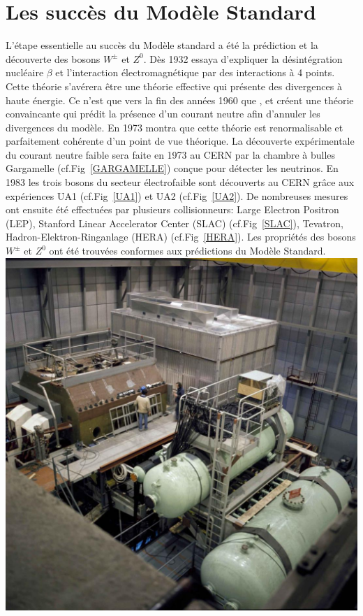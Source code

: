 \section{Les succès du Modèle Standard}
L'étape essentielle au succès du Modèle standard a été la prédiction et la découverte des bosons $W^{\pm}$ et $Z^{0}$. Dès \num{1932}  essaya d'expliquer la désintégration nucléaire $\beta$ et l'interaction électromagnétique par des interactions à \num{4} points. Cette théorie s'avérera être une théorie effective qui présente des divergences à haute énergie. Ce n'est que vers la fin des années \num{1960} que ,  et  créent une théorie convaincante qui prédit la présence d'un courant neutre afin d'annuler les divergences du modèle. En \num{1973}  montra que cette théorie est renormalisable et parfaitement cohérente d'un point de vue théorique. La découverte expérimentale du courant neutre faible sera faite en \num{1973} au CERN par la chambre à bulles Gargamelle (cf.Fig~\ref{GARGAMELLE}) conçue pour détecter les neutrinos. En \num{1983} les trois bosons du secteur électrofaible sont découverts au CERN grâce aux expériences UA1 (cf.Fig~\ref{UA1}) et UA2 (cf.Fig~\ref{UA2}). De nombreuses mesures ont ensuite été effectuées par plusieurs collisionneurs: Large Electron Positron (LEP), Stanford Linear Accelerator Center (SLAC) (cf.Fig~\ref{SLAC}), Tevatron, Hadron-Elektron-Ringanlage (HERA) (cf.Fig~\ref{HERA}). Les propriétés des bosons $W^{\pm}$ et $Z^{0}$ ont été trouvées conformes aux prédictions du Modèle Standard. 
\marginpar
{
	\centering
	\includegraphics[width=\marginparwidth]{SM/gargamelle.jpg}
	\label{GARGAMELLE}
}
